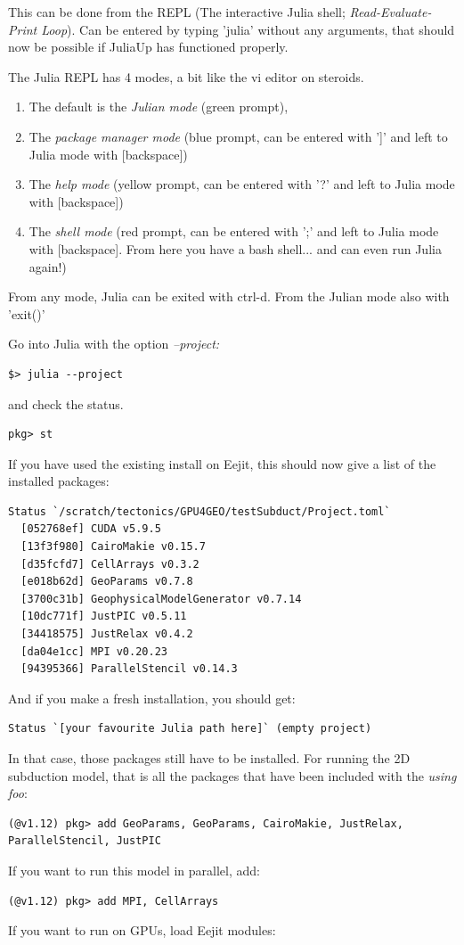 \documentclass{article}
\begin{document}
This can be done from the REPL (The interactive Julia shell; \textit{Read-Evaluate-Print Loop}).
Can be entered by typing 'julia' without any arguments, that should now be possible
if JuliaUp has functioned properly.

The Julia REPL has 4 modes, a bit like the vi editor on steroids.
\begin{enumerate}
\item The default is the \textit{Julian mode} (green prompt),
\item The \textit{package manager mode} (blue prompt, can be entered with ']' and left to Julia mode with [backspace])
\item The \textit{help mode} (yellow prompt, can be entered with '?' and left to Julia mode with [backspace])
\item The \textit{shell mode} (red prompt, can be entered with ';' and left to Julia mode with [backspace]. From here you have a bash shell... and can even run Julia again!)
\end{enumerate}
From any mode, Julia can be exited with ctrl-d. From the Julian mode also with 'exit()'

Go into Julia with the option \textit{--project:}
\begin{verbatim}
$> julia --project
\end{verbatim}

and check the status.
\begin{verbatim}
pkg> st
\end{verbatim}

If you have used the existing install on Eejit, this should now give a list of the installed packages:

\begin{verbatim}
Status `/scratch/tectonics/GPU4GEO/testSubduct/Project.toml`
  [052768ef] CUDA v5.9.5
  [13f3f980] CairoMakie v0.15.7
  [d35fcfd7] CellArrays v0.3.2
  [e018b62d] GeoParams v0.7.8
  [3700c31b] GeophysicalModelGenerator v0.7.14
  [10dc771f] JustPIC v0.5.11
  [34418575] JustRelax v0.4.2
  [da04e1cc] MPI v0.20.23
  [94395366] ParallelStencil v0.14.3
\end{verbatim}

And if you make a fresh installation, you should get:
\begin{verbatim}
Status `[your favourite Julia path here]` (empty project)
\end{verbatim}

In that case, those packages still have to be installed.
For running the 2D subduction model, that is all the packages 
that have been included with the \textit{using foo}:
\begin{verbatim}
(@v1.12) pkg> add GeoParams, GeoParams, CairoMakie, JustRelax, ParallelStencil, JustPIC
\end{verbatim}
If you want to run this model in parallel, add:
\begin{verbatim}
(@v1.12) pkg> add MPI, CellArrays
\end{verbatim}
If you want to run on GPUs, 
load Eejit modules:
\begin{verbatim}

\end{verbatim}
\end{document}
